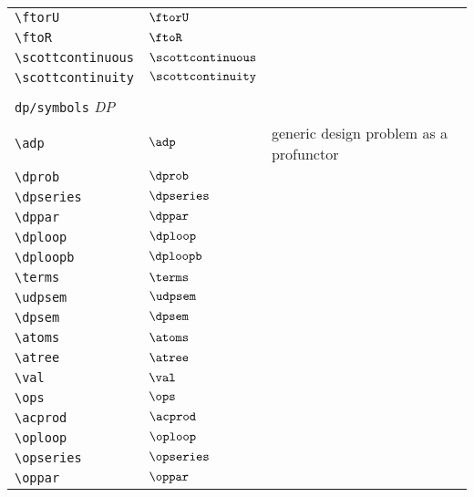 \begin{longtable}{lll}
 {\color[rgb]{0.5,0.5,0.5}\texttt{\textbackslash ftorU}} & $\ftorU$ & \\ 
 {\color[rgb]{0.5,0.5,0.5}\texttt{\textbackslash ftoR}} & $\ftoR$ & \\ 
 {\color[rgb]{0.5,0.5,0.5}\texttt{\textbackslash scottcontinuous}} & $\scottcontinuous$ & \\ 
 {\color[rgb]{0.5,0.5,0.5}\texttt{\textbackslash scottcontinuity}} & $\scottcontinuity$ & \\ 
  &  & \\ 
 \multicolumn{3}{l}{{\color[rgb]{0.5,0.5,0.5}\texttt{dp/symbols}} \emph{DP}}\\ 
 \hline
{\color[rgb]{0.5,0.5,0.5}\texttt{\textbackslash adp}} & $\adp$ &  generic design problem as a profunctor\\ 
 {\color[rgb]{0.5,0.5,0.5}\texttt{\textbackslash dprob}} & $\dprob$ & \\ 
 {\color[rgb]{0.5,0.5,0.5}\texttt{\textbackslash dpseries}} & $\dpseries$ & \\ 
 {\color[rgb]{0.5,0.5,0.5}\texttt{\textbackslash dppar}} & $\dppar$ & \\ 
 {\color[rgb]{0.5,0.5,0.5}\texttt{\textbackslash dploop}} & $\dploop$ & \\ 
 {\color[rgb]{0.5,0.5,0.5}\texttt{\textbackslash dploopb}} & $\dploopb$ & \\ 
 {\color[rgb]{0.5,0.5,0.5}\texttt{\textbackslash terms}} & $\terms$ & \\ 
 {\color[rgb]{0.5,0.5,0.5}\texttt{\textbackslash udpsem}} & $\udpsem$ & \\ 
 {\color[rgb]{0.5,0.5,0.5}\texttt{\textbackslash dpsem}} & $\dpsem$ & \\ 
 {\color[rgb]{0.5,0.5,0.5}\texttt{\textbackslash atoms}} & $\atoms$ & \\ 
 {\color[rgb]{0.5,0.5,0.5}\texttt{\textbackslash atree}} & $\atree$ & \\ 
 {\color[rgb]{0.5,0.5,0.5}\texttt{\textbackslash val}} & $\val$ & \\ 
 {\color[rgb]{0.5,0.5,0.5}\texttt{\textbackslash ops}} & $\ops$ & \\ 
 {\color[rgb]{0.5,0.5,0.5}\texttt{\textbackslash acprod}} & $\acprod$ & \\ 
 {\color[rgb]{0.5,0.5,0.5}\texttt{\textbackslash oploop}} & $\oploop$ & \\ 
 {\color[rgb]{0.5,0.5,0.5}\texttt{\textbackslash opseries}} & $\opseries$ & \\ 
 {\color[rgb]{0.5,0.5,0.5}\texttt{\textbackslash oppar}} & $\oppar$ & \\ 

\end{longtable}
